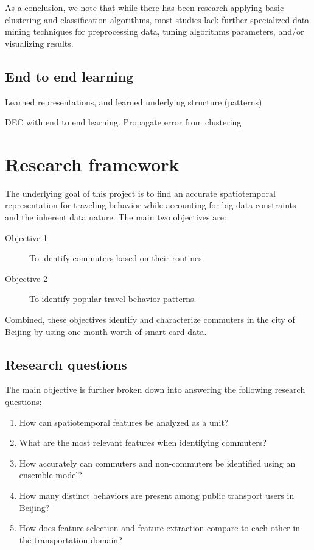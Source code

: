 \documentclass{article}
\begin{document}
As a conclusion, we note that while there has been research applying basic clustering and classification algorithms, most studies lack further specialized data mining techniques for preprocessing data, tuning algorithms parameters, and/or visualizing results. 


\subsection{End to end learning}
Learned representations, and learned underlying structure (patterns)

DEC with end to end learning. Propagate error from clustering


\newpage
\section{Research framework}
The underlying goal of this project is to find an accurate spatiotemporal representation for traveling behavior while accounting for big data constraints and the inherent data nature. The main two objectives are:

\begin{description}
\item[Objective 1] To identify commuters based on their routines. \label{eqn:obj1}
\item[Objective 2] To identify popular travel behavior patterns. \label{eqn:obj2}
\end{description}

Combined, these objectives identify and characterize commuters in the city of Beijing by using one month worth of smart card data. 

\subsection{Research questions}
The main objective is further broken down into answering the following research questions: 

\begin{enumerate}

\item How can spatiotemporal features be analyzed as a unit?

\item What are the most relevant features when identifying commuters?

\item How accurately can commuters and non-commuters be identified using an ensemble model? 

\item How many distinct behaviors are present among public transport users in Beijing?

\item How does feature selection and feature extraction compare to each other in the transportation domain?

\end{enumerate}
\end{document}
